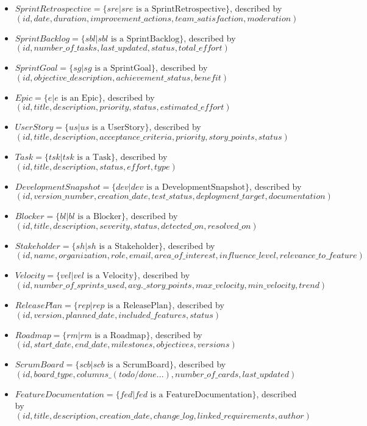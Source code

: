 \documentclass[11pt]{article}
\begin{document}
\begin{itemize}
    \item $SprintRetrospective = \{sre | sre \text{ is a SprintRetrospective}\}$, described by $(id, date, duration, improvement\_actions, team\_satisfaction, moderation)$
    \item $SprintBacklog = \{sbl | sbl \text{ is a SprintBacklog}\}$, described by $(id, number\_of\_tasks, last\_updated, status, total\_effort)$
    \item $SprintGoal = \{sg | sg \text{ is a SprintGoal}\}$, described by $(id, objective\_description, achievement\_status, benefit)$
    \item $Epic = \{e | e \text{ is an Epic}\}$, described by $(id, title, description, priority, status, estimated\_effort)$
    \item $UserStory = \{us | us \text{ is a UserStory}\}$, described by $(id, title, description, acceptance\_criteria, priority, story\_points, status)$
    \item $Task = \{tsk | tsk \text{ is a Task}\}$, described by $(id, title, description, status, effort, type)$
    \item $DevelopmentSnapshot = \{dev | dev \text{ is a DevelopmentSnapshot}\}$, described by $(id, version\_number, creation\_date, test\_status, deployment\_target, documentation)$
    \item $Blocker = \{bl | bl \text{ is a Blocker}\}$, described by $(id, title, description, severity, status, detected\_on, resolved\_on)$
    \item $Stakeholder = \{sh | sh \text{ is a Stakeholder}\}$, described by $(id, name, organization, role, email, area\_of\_interest, influence\_level, relevance\_to\_feature)$
    \item $Velocity = \{vel | vel \text{ is a Velocity}\}$, described by $(id, number\_of\_sprints\_used, avg.\_story\_points, max\_velocity, min\_velocity, trend)$
    \item $ReleasePlan = \{rep | rep \text{ is a ReleasePlan}\}$, described by $(id, version, planned\_date, included\_features, status)$
    \item $Roadmap = \{rm | rm \text{ is a Roadmap}\}$, described by $(id, start\_date, end\_date, milestones, objectives, versions)$
    \item $ScrumBoard = \{scb | scb \text{ is a ScrumBoard}\}$, described by $(id, board\_type, columns\_(todo/done...), number\_of\_cards, last\_updated)$
    \item $FeatureDocumentation = \{fed | fed \text{ is a FeatureDocumentation}\}$, described by $(id, title, description, creation\_date, change\_log, linked\_requirements, author)$
\end{itemize}
\end{document}
